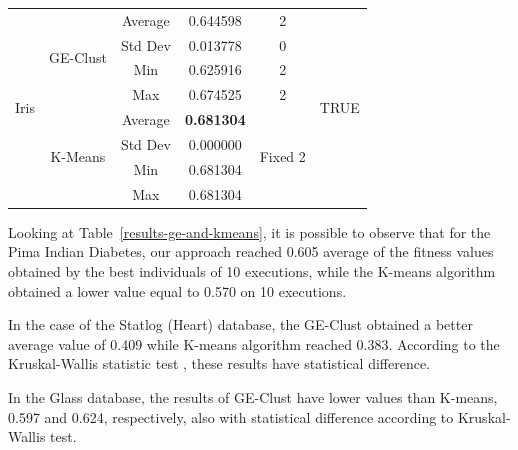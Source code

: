 \documentclass[conference,compsoc]{IEEEtran}
\begin{document}
\begin{table}[]
\begin{tabular}{|c|c|c|c|c|c|}
		\multirow{8}{*}{Iris}                  & \multirow{4}{*}{GE-Clust}           & Average                        & 0.644598                   & 2                        & \multirow{8}{*}{TRUE} \\ \cline{3-5}
		&                               & Std Dev                        & 0.013778                   & 0                        &                       \\ \cline{3-5}
		&                               & Min                            & 0.625916                   & 2                        &                       \\ \cline{3-5}
		&                               & Max                            & 0.674525                   & 2                        &                       \\ \cline{2-5}
		& \multirow{4}{*}{K-Means}      & Average                        & \textbf{0.681304}                   & \multirow{4}{*}{Fixed 2} &                       \\ \cline{3-4}
		&                               & Std Dev                        & 0.000000                   &                          &                       \\ \cline{3-4}
		&                               & Min                            & 0.681304                   &                          &                       \\ \cline{3-4}
		&                               & Max                            & 0.681304                   &                          &                       \\ \cline{3-4}							\hline
	\end{tabular}
\end{table}



Looking at Table~\ref{results-ge-and-kmeans}, it is possible to observe that for the Pima Indian Diabetes, our approach reached 0.605 average of the fitness values obtained by the best individuals of 10 executions, while the K-means algorithm obtained a lower value equal to 0.570 on 10 executions.

In the case of the Statlog (Heart) database,  the GE-Clust obtained a better average value of 0.409 while K-means algorithm reached 0.383. According to the  Kruskal-Wallis statistic test \cite{mckight2010kruskal}, these results have statistical difference.

In the Glass database, the results of GE-Clust have lower values than K-means, 0.597 and 0.624, respectively, also with statistical difference according to Kruskal- Wallis test. 
\end{document}
